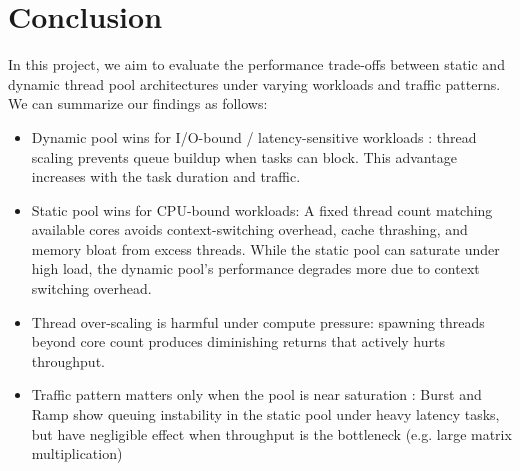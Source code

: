 \documentclass[sigconf, 10pt]{acmart}
\begin{document}

\section{Conclusion}
In this project, we aim to evaluate the performance trade-offs between static and dynamic thread pool architectures under varying workloads and traffic patterns.
We can summarize our findings as follows:
\begin{itemize}
    \item Dynamic pool wins for I/O-bound / latency-sensitive workloads : thread scaling prevents queue buildup when tasks can block. This advantage increases with the task duration and traffic.
    \item Static pool wins for CPU-bound workloads: A fixed thread count matching available cores avoids context-switching overhead, cache thrashing, and memory bloat from excess threads. While the static pool can saturate under high load, the dynamic pool's performance degrades more due to context switching overhead.
    \item Thread over-scaling is harmful under compute pressure: spawning threads beyond core count produces diminishing returns that actively hurts throughput.
    \item Traffic pattern matters only when the pool is near saturation : Burst and Ramp show queuing instability in the static pool under heavy latency tasks, but have negligible effect when throughput is the bottleneck (e.g. large matrix multiplication)
\end{itemize}
\end{document}
